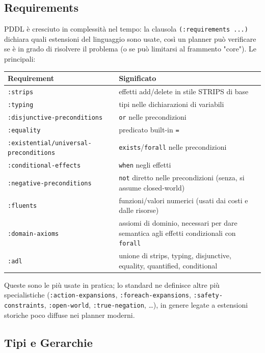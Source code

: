 \documentclass[a4paper,11pt]{article}
\begin{document}
\subsection{Requirements}

PDDL è cresciuto in complessità nel tempo: la clausola \texttt{(:requirements ...)} dichiara quali estensioni del linguaggio sono usate, così un planner può verificare se è in grado di risolvere il problema (o se può limitarsi al frammento "core"). Le principali:

\begin{center}
\small
\begin{tabular}{@{}p{4.6cm}p{9.5cm}@{}}
\toprule
\textbf{Requirement} & \textbf{Significato} \\
\midrule
\texttt{:strips} & effetti add/delete in stile STRIPS di base \\
\texttt{:typing} & tipi nelle dichiarazioni di variabili \\
\texttt{:disjunctive-\allowbreak preconditions} & \texttt{or} nelle precondizioni \\
\texttt{:equality} & predicato built-in \texttt{=} \\
\texttt{:existential/\allowbreak universal-\allowbreak preconditions} & \texttt{exists}/\texttt{forall} nelle precondizioni \\
\texttt{:conditional-\allowbreak effects} & \texttt{when} negli effetti \\
\texttt{:negative-\allowbreak preconditions} & \texttt{not} diretto nelle precondizioni (senza, si assume closed-world) \\
\texttt{:fluents} & funzioni/valori numerici (usati dai costi e dalle risorse) \\
\texttt{:domain-\allowbreak axioms} & assiomi di dominio, necessari per dare semantica agli effetti condizionali con \texttt{forall} \\
\texttt{:adl} & unione di strips, typing, disjunctive, equality, quantified, conditional \\
\bottomrule
\end{tabular}
\end{center}
Queste sono le più usate in pratica; lo standard ne definisce altre più specialistiche (\texttt{:action-expansions}, \texttt{:foreach-expansions}, \texttt{:safety-constraints}, \texttt{:open-world}, \texttt{:true-negation}, \ldots), in genere legate a estensioni storiche poco diffuse nei planner moderni.

\subsection{Tipi e Gerarchie}
\end{document}
